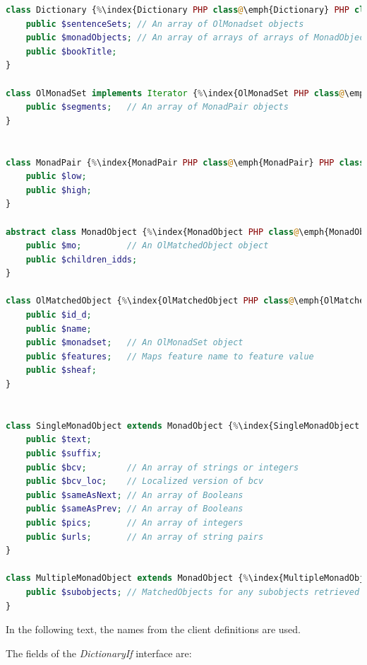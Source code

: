 \documentclass[11pt,oneside,a4paper]{memoir}
\begin{document}
\begin{lstlisting}[language=PHP]
class Dictionary {%\index{Dictionary PHP class@\emph{Dictionary} PHP class}%
    public $sentenceSets; // An array of OlMonadset objects
    public $monadObjects; // An array of arrays of arrays of MonadObject objects
    public $bookTitle;
}

class OlMonadSet implements Iterator {%\index{OlMonadSet PHP class@\emph{OlMonadSet} PHP class}%
    public $segments;   // An array of MonadPair objects
}


class MonadPair {%\index{MonadPair PHP class@\emph{MonadPair} PHP class}%
    public $low;
    public $high;
}

abstract class MonadObject {%\index{MonadObject PHP class@\emph{MonadObject} PHP class}%
    public $mo;         // An OlMatchedObject object
    public $children_idds;
}

class OlMatchedObject {%\index{OlMatchedObject PHP class@\emph{OlMatchedObject} PHP class}%
    public $id_d;
    public $name;
    public $monadset;   // An OlMonadSet object
    public $features;   // Maps feature name to feature value
    public $sheaf;
}


class SingleMonadObject extends MonadObject {%\index{SingleMonadObject PHP class@\emph{SingleMonadObject} PHP class}%
    public $text;
    public $suffix;
    public $bcv;        // An array of strings or integers
    public $bcv_loc;    // Localized version of bcv
    public $sameAsNext; // An array of Booleans
    public $sameAsPrev; // An array of Booleans
    public $pics;       // An array of integers
    public $urls;       // An array of string pairs
}

class MultipleMonadObject extends MonadObject {%\index{MultipleMonadObject PHP class@\emph{MultipleMonadObject} PHP class}%
    public $subobjects; // MatchedObjects for any subobjects retrieved for this MultipleMonadObject
}
\end{lstlisting}

In the following text, the names from the client definitions are used.

The fields of the \emph{DictionaryIf} interface are:
\end{document}
